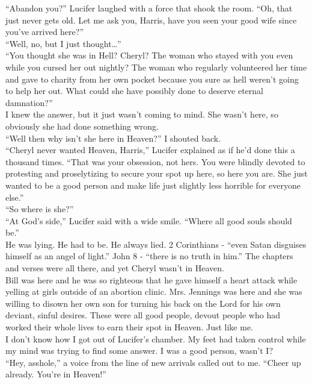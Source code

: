 \enquote{Abandon you?} Lucifer laughed with a force that shook the room. \enquote{Oh, that just never gets old. Let me ask you, Harris, have you seen your good wife since you've arrived here?}\\



\enquote{Well, no, but I just thought\dots }\\



\enquote{You thought she was in Hell? Cheryl? The woman who stayed with you even while you cursed her out nightly? The woman who regularly volunteered her time and gave to charity from her own pocket because you sure as hell weren't going to help her out. What could she have possibly done to deserve eternal damnation?}\\



I knew the answer, but it just wasn't coming to mind. She wasn't here, so obviously she had done something wrong.\\



\enquote{Well then why isn't she here in Heaven?} I shouted back.\\



\enquote{Cheryl never wanted Heaven, Harris,} Lucifer explained as if he'd done this a thousand times. \enquote{That was your obsession, not hers. You were blindly devoted to protesting and proselytizing to secure your spot up here, so here you are. She just wanted to be a good person and make life just slightly less horrible for everyone else.}\\



\enquote{So where is she?}\\



\enquote{At God's side,} Lucifer said with a wide smile. \enquote{Where all good souls should be.}\\



He was lying. He had to be. He always lied. 2 Corinthians - \enquote{even Satan disguises himself as an angel of light.} John 8 - \enquote{there is no truth in him.} The chapters and verses were all there, and yet Cheryl wasn't in Heaven.\\



Bill was here and he was so righteous that he gave himself a heart attack while yelling at girls outside of an abortion clinic. Mrs. Jennings was here and she was willing to disown her own son for turning his back on the Lord for his own deviant, sinful desires. These were all good people, devout people who had worked their whole lives to earn their spot in Heaven. Just like me.\\



I don't know how I got out of Lucifer's chamber. My feet had taken control while my mind was trying to find some answer. I was a good person, wasn't I?\\



\enquote{Hey, asshole,} a voice from the line of new arrivals called out to me. \enquote{Cheer up already.  You're in Heaven!}\\

